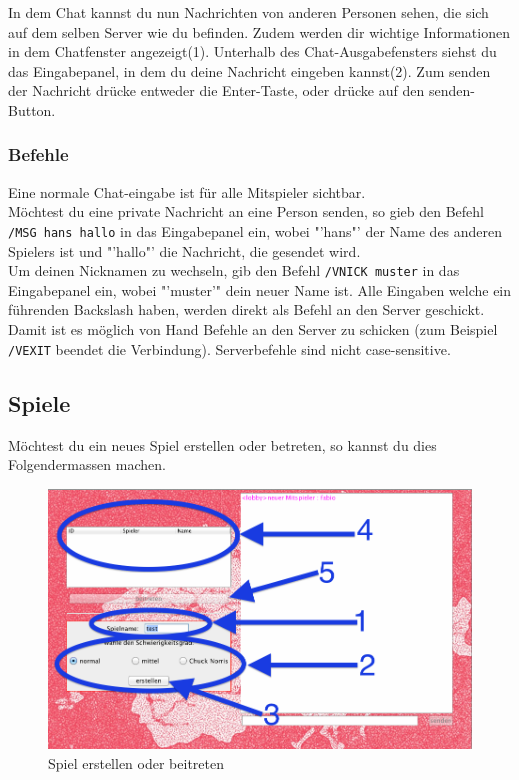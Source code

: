 \documentclass[ngerman, 12pt, pdftex]{scrartcl}[2006/07/30]
\begin{document}
In dem Chat kannst du nun Nachrichten von anderen Personen sehen, die sich auf dem selben Server wie du befinden. Zudem werden dir wichtige Informationen in dem Chatfenster angezeigt(1).
Unterhalb des Chat-Ausgabefensters siehst du das Eingabepanel, in dem du deine Nachricht eingeben kannst(2). Zum senden der Nachricht dr\"{u}cke entweder die Enter-Taste, oder dr\"{u}cke auf den senden-Button.
\subsubsection{Befehle}
Eine normale Chat-eingabe ist f\"{u}r alle Mitspieler sichtbar. \\
M\"{o}chtest du eine private Nachricht an eine Person senden, so gieb den Befehl \lstinline{/MSG hans hallo} in das Eingabepanel ein, wobei "'hans"' der Name des anderen Spielers ist und "'hallo"' die Nachricht, die gesendet wird. \\
Um deinen Nicknamen zu wechseln, gib den Befehl \lstinline{/VNICK muster} in das Eingabepanel ein, wobei "'muster'" dein neuer Name ist.
Alle Eingaben welche ein führenden Backslash haben, werden direkt als Befehl an den Server geschickt. Damit ist es möglich von Hand Befehle an den Server zu schicken (zum Beispiel \lstinline{/VEXIT} beendet die Verbindung). Serverbefehle sind nicht case-sensitive.

\newpage

\subsection{Spiele}
M\"{o}chtest du ein neues Spiel erstellen oder betreten, so kannst du dies Folgendermassen machen.

\begin{figure}[h]
\centering
\includegraphics[scale=0.3]{lobby/spiel_erstellen.png}
\caption{Spiel erstellen oder beitreten}
\end{figure}
\end{document}
